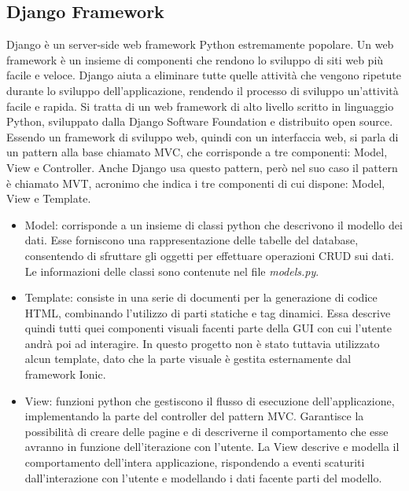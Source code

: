 \documentclass{article}
\begin{document}
\subsection{Django Framework}
Django è un server-side web framework Python estremamente popolare. Un web framework è un insieme di componenti che rendono lo sviluppo di siti web più facile e veloce. 
Django aiuta a eliminare tutte quelle attività che vengono ripetute durante lo sviluppo dell'applicazione, rendendo il processo di sviluppo un'attività facile e rapida. 
Si tratta di un web framework di alto livello scritto in linguaggio Python, sviluppato dalla Django Software Foundation e distribuito open source. 
Essendo un framework di sviluppo web, quindi con un interfaccia web, si parla di un pattern alla base chiamato MVC, che corrisponde a tre componenti: Model, View e Controller.
Anche Django usa questo pattern, però nel suo caso il pattern è chiamato MVT, acronimo che indica i tre componenti di cui dispone: Model, View e Template.
\begin{itemize}
\item Model: corrisponde a un insieme di classi python che descrivono il modello dei dati. Esse forniscono una rappresentazione delle tabelle del database, consentendo di sfruttare gli oggetti per effettuare operazioni CRUD sui dati. Le informazioni delle classi sono contenute nel file \textit{models.py}.

\item Template: consiste in una serie di documenti per la generazione di codice HTML, combinando l'utilizzo di parti statiche e tag dinamici. Essa descrive quindi tutti quei componenti visuali facenti parte della GUI con cui l'utente andrà poi ad interagire. In questo progetto non è stato tuttavia utilizzato alcun template, dato che la parte visuale è gestita esternamente dal framework Ionic. 

\item View: funzioni python che gestiscono il flusso di esecuzione dell'applicazione, implementando la parte del controller del pattern MVC. Garantisce la possibilità di creare delle pagine e di descriverne il comportamento che esse avranno in funzione dell'iterazione con l'utente. La View descrive e modella il comportamento dell'intera applicazione, rispondendo a eventi scaturiti dall'interazione con l'utente e modellando i dati facente parti del modello.
\end{itemize}
\end{document}
